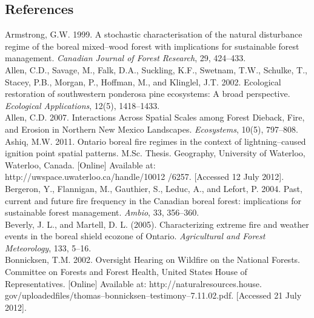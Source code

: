 \begin{spacing}{1.5}
\phantom
\phantom
\phantom
\phantom
\section{References}
\phantom
\phantom
\noindent Armstrong, G.W. 1999. A stochastic characterisation of the natural disturbance regime of the boreal mixed--wood forest with implications for sustainable forest management. \emph{Canadian Journal of Forest Research}, 29, 424--433.\\

\noindent Allen, C.D., Savage, M., Falk, D.A., Suckling, K.F., Swetnam, T.W., Schulke, T., Stacey, P.B., Morgan, P., Hoffman, M., and Klinglel, J.T. 2002. Ecological restoration of southwestern ponderosa pine ecosystems: A broad perspective. \emph{Ecological Applications}, 12(5), 1418--1433.\\

\noindent Allen, C.D. 2007. Interactions Across Spatial Scales among Forest Dieback, Fire, and Erosion in Northern New Mexico Landscapes. \emph{Ecosystems}, 10(5), 797--808.\\

\noindent Ashiq, M.W. 2011. Ontario boreal fire regimes in the context of lightning--caused ignition point spatial patterns. M.Sc. Thesis. Geography, University of Waterloo, Waterloo, Canada. [Online] Available at: http://uwspace.uwaterloo.ca/han\linebreak dle/10012 /6257. [Accessed 12 July 2012].\\

\noindent Bergeron, Y., Flannigan, M., Gauthier, S., Leduc, A., and Lefort, P. 2004. Past, current and future fire frequency in the Canadian boreal forest: implications for sustainable forest management. \emph{Ambio}, 33, 356--360.\\

\noindent Beverly, J. L., and Martell, D. L. (2005). Characterizing extreme fire and weather events in the boreal shield ecozone of Ontario. \emph{Agricultural and Forest Meteorology}, 133, 5--16.\\

\noindent Bonnicksen, T.M. 2002. Oversight Hearing on Wildfire on the National Forests. Committee on Forests and Forest Health, United States House of Representatives. [Online] Available at: http://naturalresources.house. gov/uploadedfiles/\linebreak thomas--bonnicksen--testimony--7.11.02.pdf. [Accessed 21 July 2012].\\


\end{spacing}
